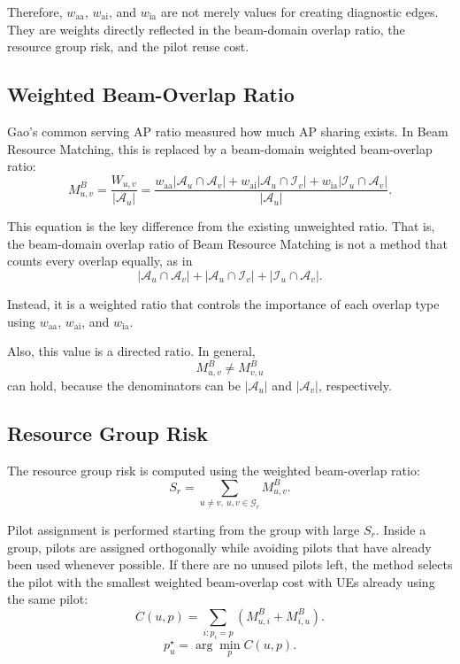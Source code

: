 \documentclass[11pt,a4paper]{article}
\newcommand{\waa}{w_{\mathrm{aa}}}
\newcommand{\wai}{w_{\mathrm{ai}}}
\newcommand{\wia}{w_{\mathrm{ia}}}
\begin{document}
Therefore, \(\waa\), \(\wai\), and \(\wia\) are not merely values for creating diagnostic edges. They are weights directly reflected in the beam-domain overlap ratio, the resource group risk, and the pilot reuse cost.

\subsection{Weighted Beam-Overlap Ratio}

Gao's common serving AP ratio measured how much AP sharing exists. In Beam Resource Matching, this is replaced by a beam-domain weighted beam-overlap ratio:
\[
    M_{u,v}^{B}
    =
    \frac{W_{u,v}}{|\mathcal{A}_u|}
    =
    \frac{
        \waa|\mathcal{A}_u\cap\mathcal{A}_v|
        +
        \wai|\mathcal{A}_u\cap\mathcal{I}_v|
        +
        \wia|\mathcal{I}_u\cap\mathcal{A}_v|
    }{|\mathcal{A}_u|}.
\]

This equation is the key difference from the existing unweighted ratio. That is, the beam-domain overlap ratio of Beam Resource Matching is not a method that counts every overlap equally, as in
\[
    |\mathcal{A}_u\cap\mathcal{A}_v|
    +
    |\mathcal{A}_u\cap\mathcal{I}_v|
    +
    |\mathcal{I}_u\cap\mathcal{A}_v|.
\]

Instead, it is a weighted ratio that controls the importance of each overlap type using \(\waa\), \(\wai\), and \(\wia\).

Also, this value is a directed ratio. In general,
\[
    M_{u,v}^{B}\neq M_{v,u}^{B}
\]
can hold, because the denominators can be \(|\mathcal{A}_u|\) and \(|\mathcal{A}_v|\), respectively.

\subsection{Resource Group Risk}

The resource group risk is computed using the weighted beam-overlap ratio:
\[
    S_r
    =
    \sum_{u\neq v,\ u,v\in\mathcal{G}_r}
    M_{u,v}^{B}.
\]

Pilot assignment is performed starting from the group with large \(S_r\). Inside a group, pilots are assigned orthogonally while avoiding pilots that have already been used whenever possible. If there are no unused pilots left, the method selects the pilot with the smallest weighted beam-overlap cost with UEs already using the same pilot:
\[
    C(u,p)
    =
    \sum_{i:p_i=p}
    \left(M_{u,i}^{B}+M_{i,u}^{B}\right).
\]
\[
    p_u^{\star}=\arg\min_{p} C(u,p).
\]
\end{document}
